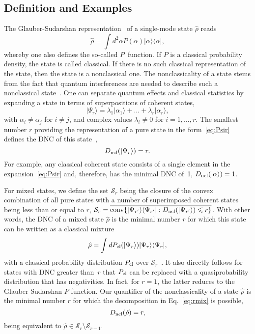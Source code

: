 \documentclass[aps,pra,twocolumn,showpacs,superscriptaddress,10pt]{revtex4-1}
\begin{document}
\subsection{Definition and Examples}
	The Glauber-Sudarshan representation~\cite{Glauber1963,Sudarshan1963} of a single-mode state $\hat{\rho}$ reads
	\begin{equation}
		\hat{\rho}=\int d^{2}\alpha P(\alpha)|\alpha\rangle\langle\alpha|, \label{eq:GS}
	\end{equation}
	whereby one also defines the so-called $P$~function.
	If $P$ is a classical probability density, the state is called classical.
	If there is no such classical representation of the state, then the state is a nonclassical one.
	The nonclassicality of a state stems from the fact that quantum interferences are needed to describe such a nonclassical state~\cite{Sperling2015}.
	One can separate quantum effects and classical statistics by expanding a state in terms of superpositions of coherent states,
	\begin{equation}
		|\Psi_{r}\rangle=\lambda_{1}|\alpha_{1}\rangle+\dots+\lambda_{r}|\alpha_{r}\rangle, \label{eq:Psir}
	\end{equation}
	with $\alpha_{i}\neq\alpha_{j}$ for $i\neq j$, and complex values $\lambda_{i}\neq0$ for $i=1,\dots, r$.
	The smallest number $r$ providing the representation of a pure state in the form~\eqref{eq:Psir} defines the DNC of this state~\cite{Gehrke2012},
	\begin{equation}
		D_{\rm ncl}(|\Psi_{r}\rangle)=r.
	\end{equation}
	For example, any classical coherent state consists of a single element in the expansion~\eqref{eq:Psir} and, therefore, has the minimal DNC of~1, $D_{\rm ncl}(|\alpha\rangle)=1$.

	For mixed states, we define the set $\mathcal{S}_{r}$ being the closure of the convex combination of all pure states with a number of superimposed coherent states being less than or equal to $r$, $\mathcal S_r=\overline{\mathrm{conv}\{|\Psi_{r'}\rangle\langle\Psi_{r'}|:D_{\rm ncl}(|\Psi_{r'}\rangle)\leqslant r\}}$.
	With other words, the DNC of a mixed state $\hat{\rho}$ is the minimal number $r$ for which this state can be written as a classical mixture
	\begin{equation}
		\hat{\rho}=\int d P_{\rm cl}(|\Psi_{r}\rangle)|\Psi_{r}\rangle\langle\Psi_{r}|, \label{eq:rmix}
	\end{equation}
	with a classical probability distribution $P_{\rm cl}$ over $\mathcal S_r$~\cite{Mraz2014}.
	It also directly follows for states with DNC greater than~$r$ that $P_{\rm cl}$ can be replaced with a quasiprobability distribution that has negativities.
	In fact, for $r=1$, the latter reduces to the Glauber-Sudarshan $P$ function.
	Our quantifier of the nonclassicality of a state $\hat\rho$ is the minimal number $r$ for which the decomposition in Eq.~\eqref{eq:rmix} is possible,
	\begin{equation}
		D_{\rm ncl}(\hat\rho)=r,
	\end{equation}
	being equivalent to $\hat\rho\in\mathcal S_{r}\setminus\mathcal S_{r-1}$.
\end{document}

